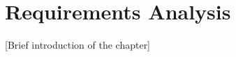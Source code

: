 \chapter{Requirements Analysis}
\label{ch:requirements_analysis}

[Brief introduction of the chapter]




